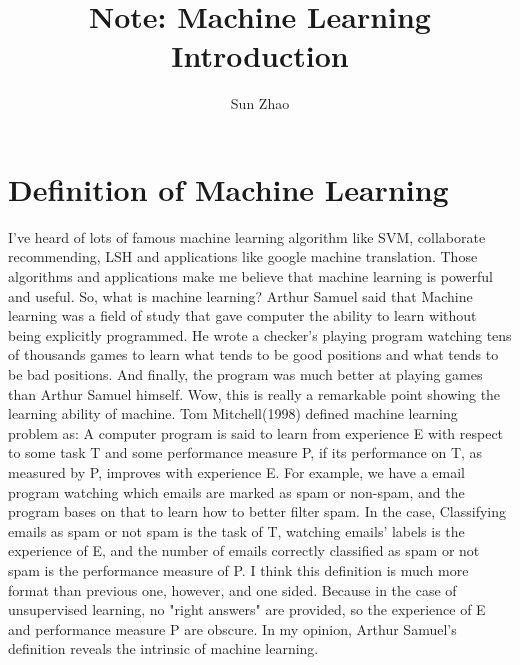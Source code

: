 \documentclass{article}
\title{Note: Machine Learning Introduction}
\author{Sun Zhao}
\begin{document}
\maketitle
\newpage

\section{Definition of Machine Learning}
I've heard of lots of famous machine learning algorithm like SVM, collaborate recommending, LSH and applications like google machine translation. Those algorithms and applications make me believe that machine learning is powerful and useful. So, what is machine learning? Arthur Samuel said that Machine learning was a field of study that gave computer the ability to learn without being explicitly programmed. He wrote a checker's playing program watching tens of thousands games to learn what tends to be good positions and what tends to be bad positions. And finally, the program was much better at playing games than Arthur Samuel himself. Wow, this is really a remarkable point showing the learning ability of machine. Tom Mitchell(1998) defined machine learning problem as: A computer program is said to learn from experience E with respect to some task T and some performance measure P, if its performance on T, as measured by P, improves with experience E. For example, we have a email program watching which emails are marked as spam or non-spam, and the program bases on that to learn how to better filter spam. In the case, Classifying emails as spam or not spam is the task of T, watching emails' labels is the experience of E, and the number of emails correctly classified as spam or not spam is the performance measure of P. I think this definition is much more format than previous one, however, and one sided. Because in the case of unsupervised learning, no "right answers" are provided, so the experience of E and performance measure P are obscure. In my opinion, Arthur Samuel's definition reveals the intrinsic of machine learning.
\end{document}
